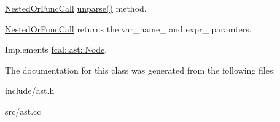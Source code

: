 \hyperlink{classfcal_1_1ast_1_1NestedOrFuncCall}{Nested\+Or\+Func\+Call} \hyperlink{classfcal_1_1ast_1_1NestedOrFuncCall_a1a8bc927427f8f11f0be98abbc89e9c9}{unparse()} method. 

\hyperlink{classfcal_1_1ast_1_1NestedOrFuncCall}{Nested\+Or\+Func\+Call} returns the var\+\_\+name\+\_\+ and expr\+\_\+ paramters. 

Implements \hyperlink{classfcal_1_1ast_1_1Node_a81865f5a1df593708a39bf492952742a}{fcal\+::ast\+::\+Node}.



The documentation for this class was generated from the following files\+:\begin{DoxyCompactItemize}
\item 
include/ast.\+h\item 
src/ast.\+cc\end{DoxyCompactItemize}
